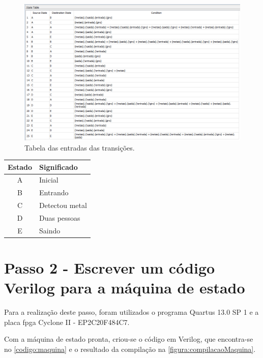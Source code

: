 		\begin{figure}[H]
			 \centering
			 \caption{\label{figura:tabelaDeTransicao}Tabela das entradas das transições.}
			 \includegraphics[width=1\textwidth]{img/tabelaDeTransicao}
		\end{figure}

		\begin{quadro}[H]
			\centering
			\caption{Significado dos estados relacionando com os estados reais do problema proposto.}
			\label{quadro:significadoEstados}
			\begin{tabular}{|c|l|}
			  \hline
			   \textbf{Estado} & \textbf{Significado}\\
			    \hline
				   A & Inicial \\
			   	\hline
			   		B & Entrando \\
			    \hline
					C & Detectou metal \\
			    \hline
			    	D & Duas pessoas \\
			    \hline
					E & Saindo \\
				\hline
			\end{tabular}
		\end{quadro}

	\section{Passo 2 - Escrever um código Verilog para a máquina de estado}
		Para a realização deste passo, foram utilizados o programa Quartus 13.0 SP 1
		 e a placa \ac{fpga} Cyclone II - EP2C20F484C7.

		Com a máquina de estado pronta, criou-se o código em Verilog, que encontra-se no \autoref{codigo:maquina} e o resultado da
		compilação na \autoref{figura:compilacaoMaquina}.

